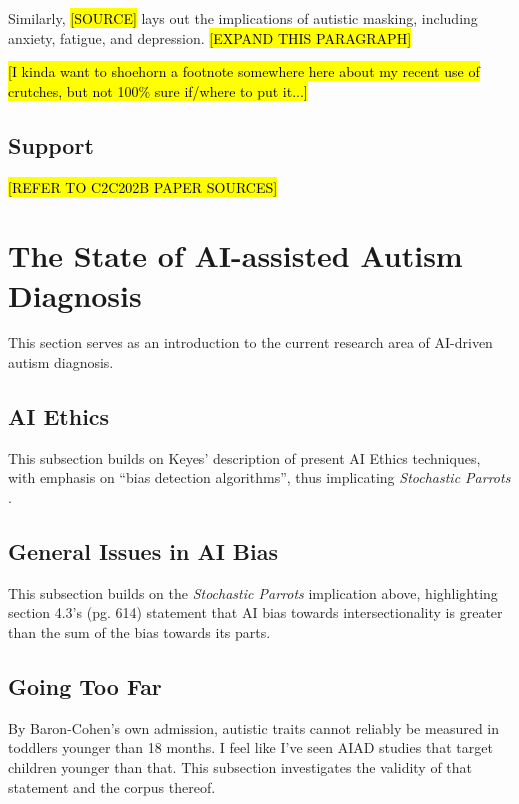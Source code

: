 \documentclass[letterpaper]{article}
\begin{document}
Similarly, \hl{[SOURCE]} lays out the implications of autistic masking, including anxiety, fatigue, and depression. \hl{[EXPAND THIS PARAGRAPH]}

\hl{[I kinda want to shoehorn a footnote somewhere here about my recent use of crutches, but not 100\% sure if/where to put it...]}



\subsection{Support}
\hl{[REFER TO C2C202B PAPER SOURCES]}



\section{The State of AI-assisted Autism Diagnosis}

This section serves as an introduction to the current research area of AI-driven autism diagnosis.

\subsection{AI Ethics}
This subsection builds on Keyes' \cite{auto} description of present AI Ethics techniques, with emphasis on “bias detection algorithms”, thus implicating \textit{Stochastic Parrots} \cite{stopar}.

\subsection{General Issues in AI Bias}
This subsection builds on the \textit{Stochastic Parrots} \cite{stopar} implication above, highlighting section 4.3's (pg. 614) statement that AI bias towards intersectionality is greater than the sum of the bias towards its parts.

\subsection{Going Too Far}
By Baron-Cohen's own admission, autistic traits cannot reliably be measured in toddlers younger than 18 months. I feel like I've seen AIAD studies that target children younger than that. This subsection investigates the validity of that statement and the corpus thereof.
\end{document}
